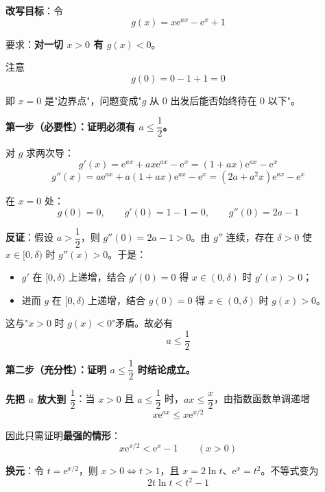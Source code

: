 \begin{answer}
\textbf{改写目标}：令
\nopagebreak[4]
\[g(x)=x\mathrm e^{ax}-\mathrm e^{x}+1\]

要求：\textbf{对一切 $x>0$ 有 $g(x)<0$}。

注意
\nopagebreak[4]
\[g(0)=0-1+1=0\]

即 $x=0$ 是"边界点"，问题变成"$g$ 从 $0$ 出发后能否始终待在 $0$ 以下"。

\par\medskip

\textbf{第一步（必要性）：证明必须有 $a\le\dfrac12$。}

对 $g$ 求两次导：
\nopagebreak[4]
\[g'(x)=\mathrm e^{ax}+ax\mathrm e^{ax}-\mathrm e^{x}=(1+ax)\mathrm e^{ax}-\mathrm e^{x}\]
\nopagebreak[4]
\[g''(x)=a\mathrm e^{ax}+a(1+ax)\mathrm e^{ax}-\mathrm e^{x}=\left(2a+a^{2}x\right)\mathrm e^{ax}-\mathrm e^{x}\]

在 $x=0$ 处：
\nopagebreak[4]
\[g(0)=0,\qquad g'(0)=1-1=0,\qquad g''(0)=2a-1\]

\textbf{反证}：假设 $a>\dfrac12$，则 $g''(0)=2a-1>0$。由 $g''$ 连续，存在 $\delta>0$ 使 $x\in[0,\delta)$ 时 $g''(x)>0$。于是：

\begin{itemize}
\item $g'$ 在 $[0,\delta)$ 上递增，结合 $g'(0)=0$ 得 $x\in(0,\delta)$ 时 $g'(x)>0$；
\item 进而 $g$ 在 $[0,\delta)$ 上递增，结合 $g(0)=0$ 得 $x\in(0,\delta)$ 时 $g(x)>0$。
\end{itemize}

这与"$x>0$ 时 $g(x)<0$"矛盾。故必有
\nopagebreak[4]
\[a\le\frac12\]

\par\medskip

\textbf{第二步（充分性）：证明 $a\le\dfrac12$ 时结论成立。}

\textbf{先把 $a$ 放大到 $\dfrac12$}：当 $x>0$ 且 $a\le\dfrac12$ 时，$ax\le\dfrac x2$，由指数函数单调递增
\nopagebreak[4]
\[x\mathrm e^{ax}\le x\mathrm e^{x/2}\]

因此只需证明\textbf{最强的情形}：
\nopagebreak[4]
\[x\mathrm e^{x/2}<\mathrm e^{x}-1\qquad(x>0)\]

\textbf{换元}：令 $t=\mathrm e^{x/2}$，则 $x>0\iff t>1$，且 $x=2\ln t$、$\mathrm e^{x}=t^{2}$。不等式变为
\nopagebreak[4]
\[2t\ln t<t^{2}-1\]


\end{answer}
